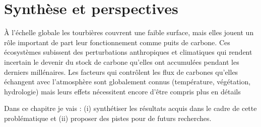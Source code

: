 \chapter*{Synthèse et perspectives}
\newpage




À l'échelle globale les tourbières couvrent une faible surface, mais elles jouent un rôle important de part leur fonctionnement comme puits de carbone.
Ces écosystèmes subissent des perturbations anthropiques et climatiques qui rendent incertain le devenir du stock de carbone qu'elles ont accumulées pendant les derniers millénaires.
Les facteurs qui contrôlent les flux de carbones qu'elles échangent avec l'atmosphère sont globalement connus (température, végétation, hydrologie) mais leurs effets nécessitent encore d'être compris plus en détails

Dans ce chapitre je vais : (i) synthétiser les résultats acquis dans le cadre de cette problématique et (ii) proposer des pistes pour de futurs recherches.

